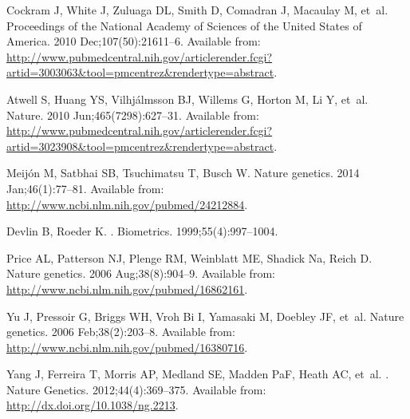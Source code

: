 \documentclass[10pt,letterpaper]{article}
\begin{document}
\begin{thebibliography}{}
Cockram J, White J, Zuluaga DL, Smith D, Comadran J, Macaulay M, et~al.
\newblock Proceedings of the National Academy of Sciences of the United States
  of America. 2010 Dec;107(50):21611--6.
\newblock Available from:
  \url{http://www.pubmedcentral.nih.gov/articlerender.fcgi?artid=3003063\&tool=pmcentrez\&rendertype=abstract}.

Atwell S, Huang YS, Vilhj\'{a}lmsson BJ, Willems G, Horton M, Li Y, et~al.
\newblock Nature. 2010 Jun;465(7298):627--31.
\newblock Available from:
  \url{http://www.pubmedcentral.nih.gov/articlerender.fcgi?artid=3023908\&tool=pmcentrez\&rendertype=abstract}.

Meij\'{o}n M, Satbhai SB, Tsuchimatsu T, Busch W.
\newblock Nature genetics. 2014 Jan;46(1):77--81.
\newblock Available from: \url{http://www.ncbi.nlm.nih.gov/pubmed/24212884}.

Devlin B, Roeder K.
.
\newblock Biometrics. 1999;55(4):997--1004.

Price AL, Patterson NJ, Plenge RM, Weinblatt ME, Shadick Na, Reich D.
\newblock Nature genetics. 2006 Aug;38(8):904--9.
\newblock Available from: \url{http://www.ncbi.nlm.nih.gov/pubmed/16862161}.

Yu J, Pressoir G, Briggs WH, {Vroh Bi} I, Yamasaki M, Doebley JF, et~al.
\newblock Nature genetics. 2006 Feb;38(2):203--8.
\newblock Available from: \url{http://www.ncbi.nlm.nih.gov/pubmed/16380716}.

Yang J, Ferreira T, Morris AP, Medland SE, Madden PaF, Heath AC, et~al.
.
\newblock Nature Genetics. 2012;44(4):369--375.
\newblock Available from: \url{http://dx.doi.org/10.1038/ng.2213}.


\end{thebibliography}
\end{document}
